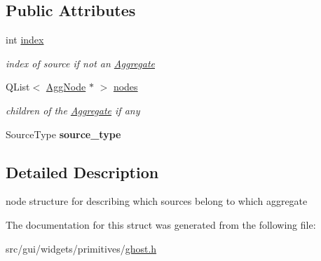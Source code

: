 \subsection*{Public Attributes}
\begin{DoxyCompactItemize}
\item 
int \hyperlink{structprim_1_1AggNode_a00fb2b61e32519620bb8bd6f30f79d97}{index}\hypertarget{structprim_1_1AggNode_a00fb2b61e32519620bb8bd6f30f79d97}{}\label{structprim_1_1AggNode_a00fb2b61e32519620bb8bd6f30f79d97}

\begin{DoxyCompactList}\small\item\em index of source if not an \hyperlink{classprim_1_1Aggregate}{Aggregate} \end{DoxyCompactList}\item 
Q\+List$<$ \hyperlink{structprim_1_1AggNode}{Agg\+Node} $\ast$ $>$ \hyperlink{structprim_1_1AggNode_a46eb56a15e6a55a9373dbbba5b364771}{nodes}\hypertarget{structprim_1_1AggNode_a46eb56a15e6a55a9373dbbba5b364771}{}\label{structprim_1_1AggNode_a46eb56a15e6a55a9373dbbba5b364771}

\begin{DoxyCompactList}\small\item\em children of the \hyperlink{classprim_1_1Aggregate}{Aggregate} if any \end{DoxyCompactList}\item 
Source\+Type {\bfseries source\+\_\+type}\hypertarget{structprim_1_1AggNode_a553e1ee04c14c6ec48bdb364d57f03fd}{}\label{structprim_1_1AggNode_a553e1ee04c14c6ec48bdb364d57f03fd}

\end{DoxyCompactItemize}


\subsection{Detailed Description}
node structure for describing which sources belong to which aggregate 

The documentation for this struct was generated from the following file\+:\begin{DoxyCompactItemize}
\item 
src/gui/widgets/primitives/\hyperlink{ghost_8h}{ghost.\+h}\end{DoxyCompactItemize}
